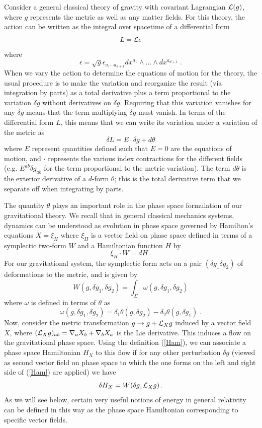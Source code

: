 \documentclass[12pt,epsf]{article}
\newcommand{\be}{\begin{equation}}
\newcommand{\ee}{\end{equation}}
\begin{document}
Consider a general classical theory of gravity with covariant Lagrangian ${\cal L}(g)$, where $g$ represents the metric as well as any matter fields. For this theory, the action can be written as the integral over spacetime of a differential form
\be
L = {\cal L} \epsilon
\ee
where
\be
\epsilon = \sqrt{g} \epsilon_{a_1 \cdots a_{d+1}} dx^{a_1} \wedge \dots \wedge dx^{a_{d+1}} \; .
\ee
When we vary the action to determine the equations of motion for the theory, the usual procedure is to make the variation and reorganize the result (via integration by parts) as a total derivative plus a term proportional to the variation $\delta g$ without derivatives on $\delta g$. Requiring that this variation vanishes for any $\delta g$ means that the term multiplying $\delta g$ must vanish. In terms of the differential form $L$, this means that we can write its variation under a variation of the metric as
\be
\delta L = E \cdot \delta g + d \theta
\ee
where $E$ represent quantities defined such that $E=0$ are the equations of motion, and $\cdot$ represents the various index contractions for the different fields (e.g. $E^{ab} \delta g_{ab}$ for the term proportional to the metric variation). The term $d \theta$ is the exterior derivative of a $d$-form $\theta$; this is the total derivative term that we separate off when integrating by parts.

The quantity $\theta$ plays an important role in the phase space formulation of our gravitational theory. We recall that in general classical mechanics systems, dynamics can be understood as evolution in phase space governed by Hamilton's equations $\dot{X} = \xi_H$ where $\xi_H$ is a vector field on phase space defined in terms of a symplectic two-form $W$ and a Hamiltonian function $H$ by
\be
\label{Ham}
\xi_H \cdot W = d H \, .
\ee
For our gravitational system, the symplectic form acts on a pair $(\delta g_1 \delta g_2)$ of deformations to the metric, and is given by
\be
W(g, \delta g_1, \delta g_2) = \int_\Sigma \omega(g, \delta g_1, \delta g_2)
\ee
where $\omega$ is defined in terms of $\theta$ as
\be
\omega(g, \delta g_1, \delta g_2) = \delta_1 \theta(g, \delta g_2) - \delta_2 \theta(g, \delta g_1) \; .
\ee
Now, consider the metric transformation $g \to g + {\cal L}_X g$ induced by a vector field $X$, where $({\cal L}_X g)_{ab} = \nabla_a X_b + \nabla_b X_a$ is the Lie derivative. This induces a flow on the gravitational phase space. Using the definition (\ref{Ham}), we can associate a phase space Hamiltonian $H_X$ to this flow if for any other perturbation $\delta g$ (viewed as second vector field on phase space to which the one forms on the left and right side of (\ref{Ham}) are applied) we have
\be\label{vh}
\delta H_X = W(\delta g, {\cal L}_X g) \, .
\ee
As we will see below, certain very useful notions of energy in general relativity can be defined in this way as the phase space Hamiltonian corresponding to specific vector fields.
\end{document}
